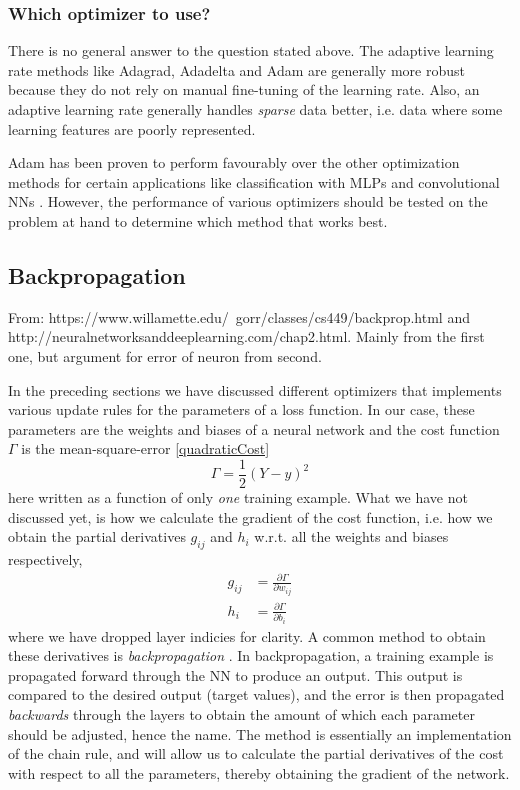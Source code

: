 \documentclass[twoside,english]{uiofysmaster}
\begin{document}
\subsubsection{Which optimizer to use?}
There is no general answer to the question stated above. The adaptive learning rate methods
like Adagrad, Adadelta and Adam are generally more robust because they do not rely on manual fine-tuning of the learning rate. 
Also, an adaptive learning rate generally handles \textit{sparse} data better, i.e. data where some learning features
are poorly represented. 

Adam has been proven to perform favourably over the other optimization methods for certain applications like classification
with MLPs and convolutional NNs \cite{Kingma14}. However, the performance of various optimizers should be tested on 
the problem at hand to determine which method that works best. 




\subsection{Backpropagation} \label{sec:backprop}
From: https://www.willamette.edu/~gorr/classes/cs449/backprop.html and \newline
http://neuralnetworksanddeeplearning.com/chap2.html. 
Mainly from the first one, but argument for error of neuron from second.

In the preceding sections we have discussed different optimizers that implements various update rules for 
the parameters of a loss function. In our case, these parameters are the weights and biases of a neural network
and the cost function $\Gamma$ is the mean-square-error \eqref{quadraticCost}
\begin{equation}
 \Gamma = \frac{1}{2} (Y - y)^2
\end{equation}
here written as a function of only \textit{one} training example. 
What we have not discussed yet, is
how we calculate the gradient of the cost function, i.e. how we obtain the partial derivatives $g_{ij}$ and $h_i$ w.r.t.
all the weights and biases respectively,
\begin{equation}
\begin{aligned}
 g_{ij} &= \frac{\partial \Gamma}{\partial w_{ij}} \\
 h_i &= \frac{\partial \Gamma}{\partial b_i}
\label{partialDerivatives}
\end{aligned}
\end{equation}
where we have dropped layer indicies for clarity. 
A common method to obtain these derivatives is \textit{backpropagation} \cite{Rumelhart86}. 
In backpropagation, a training example is propagated forward through the NN to produce an output. 
This output is compared to the desired output (target values), and the error is then propagated \textit{backwards}
through the layers to obtain the amount of which each parameter should be adjusted, 
hence the name.
The method is essentially an implementation of the chain rule, and will allow us to calculate
the partial derivatives of the cost with respect to all the parameters, thereby obtaining the gradient of the network. 
\end{document}
